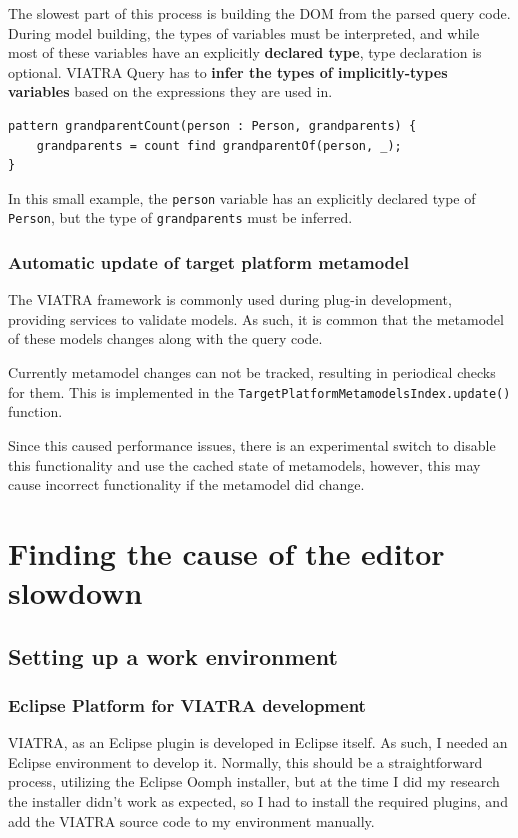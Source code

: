 \documentclass[11pt,a4paper,oneside]{report}
\begin{document}
The slowest part of this process is building the DOM from the parsed query code.
During model building, the types of variables must be interpreted, and while
most of these variables have an explicitly \textbf{declared type}, type
declaration is optional. VIATRA Query has to \textbf{infer the types of
implicitly-types variables} based on the expressions they are used in.

\begin{lstlisting}[caption={A pattern with variables of both declared and inferred types}, frame=single]
pattern grandparentCount(person : Person, grandparents) {
    grandparents = count find grandparentOf(person, _);
}
\end{lstlisting}

In this small example, the \texttt{person} variable has an explicitly declared
type of \texttt{Person}, but the type of \texttt{grandparents} must be inferred.

\subsection{Automatic update of target platform metamodel}\label{subsec:MetamodelUpdate}
The VIATRA framework is commonly used during plug-in development, providing
services to validate models. As such, it is common that the metamodel of these
models changes along with the query code.

Currently metamodel changes can not be tracked, resulting in periodical checks
for them. This is implemented in the
\texttt{TargetPlatformMetamodelsIndex.update()} function.

Since this caused performance issues, there is an experimental switch to disable
this functionality and use the cached state of metamodels, however, this may
cause incorrect functionality if the metamodel did change.

\chapter{Finding the cause of the editor slowdown}

\section{Setting up a work environment}

\subsection{Eclipse Platform for VIATRA development}
VIATRA, as an Eclipse plugin is developed in Eclipse itself. As such, I needed
an Eclipse environment to develop it. Normally, this should be a straightforward
process, utilizing the Eclipse Oomph installer, but at the time I did my
research the installer didn't work as expected, so I had to install the required
plugins, and add the VIATRA source code to my environment manually.
\end{document}
